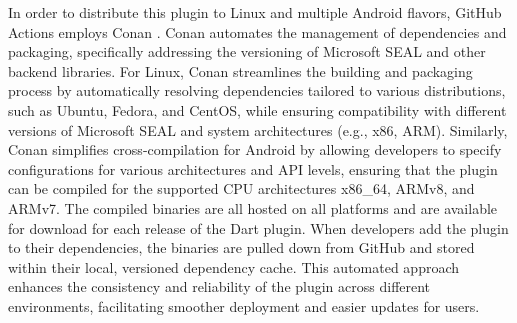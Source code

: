 In order to distribute this plugin to Linux and multiple Android flavors, GitHub Actions employs Conan \cite{Conan}. Conan automates the management of dependencies and packaging, specifically addressing the versioning of Microsoft SEAL and other backend libraries. For Linux, Conan streamlines the building and packaging process by automatically resolving dependencies tailored to various distributions, such as Ubuntu, Fedora, and CentOS, while ensuring compatibility with different versions of Microsoft SEAL and system architectures (e.g., x86, ARM). Similarly, Conan simplifies cross-compilation for Android by allowing developers to specify configurations for various architectures and API levels, ensuring that the plugin can be compiled for the supported CPU architectures x86\_64, ARMv8, and ARMv7. The compiled binaries are all hosted on all platforms and are available for download for each release of the Dart plugin. When developers add the plugin to their dependencies, the binaries are pulled down from GitHub and stored within their local, versioned dependency cache. This automated approach enhances the consistency and reliability of the plugin across different environments, facilitating smoother deployment and easier updates for users.
